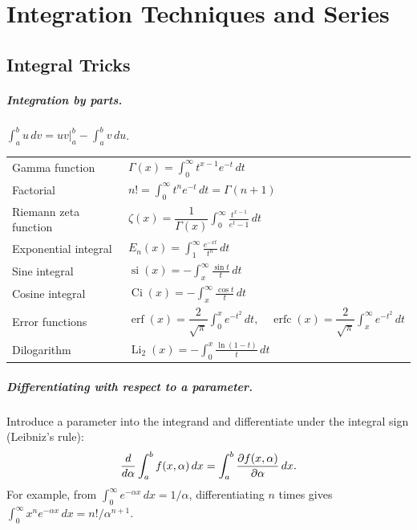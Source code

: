 \chapter{Integration Techniques and Series}

\section{Integral Tricks}

\paragraph{Integration by parts.} $\displaystyle\int_a^b u\,dv = uv\Big|_a^b - \int_a^b v\,du$.

\begin{definition}
\begin{center}
\renewcommand{\arraystretch}{1.9}
\begin{tabular}{l|l}
Gamma function & $\Gamma(x) = \displaystyle\int_0^\infty t^{x-1}e^{-t}\,dt$ \\
Factorial & $n! = \displaystyle\int_0^\infty t^n e^{-t}\,dt = \Gamma(n+1)$ \\
Riemann zeta function & $\zeta(x) = \dfrac{1}{\Gamma(x)}\displaystyle\int_0^\infty \frac{t^{x-1}}{e^t-1}\,dt$ \\
Exponential integral & $E_n(x) = \displaystyle\int_1^\infty \frac{e^{-xt}}{t^n}\,dt$ \\
Sine integral & $\operatorname{si}(x) = -\displaystyle\int_x^\infty \frac{\sin t}{t}\,dt$ \\
Cosine integral & $\operatorname{Ci}(x) = -\displaystyle\int_x^\infty \frac{\cos t}{t}\,dt$ \\
Error functions & $\operatorname{erf}(x) = \dfrac{2}{\sqrt\pi}\displaystyle\int_0^x e^{-t^2}\,dt, \quad \operatorname{erfc}(x) = \dfrac{2}{\sqrt\pi}\displaystyle\int_x^\infty e^{-t^2}\,dt$ \\
Dilogarithm & $\operatorname{Li}_2(x) = -\displaystyle\int_0^x \frac{\ln(1-t)}{t}\,dt$
\end{tabular}
\end{center}
\end{definition}

\paragraph{Differentiating with respect to a parameter.} Introduce a parameter into the integrand and differentiate under the integral sign (Leibniz's rule):
\[
    \frac{d}{d\alpha}\int_a^b f(x,\alpha)\,dx = \int_a^b \pdv{f(x,\alpha)}{\alpha}\,dx .
\]
For example, from $\int_0^\infty e^{-\alpha x}\,dx = 1/\alpha$, differentiating $n$ times gives $\int_0^\infty x^n e^{-\alpha x}\,dx = n!/\alpha^{n+1}$.

